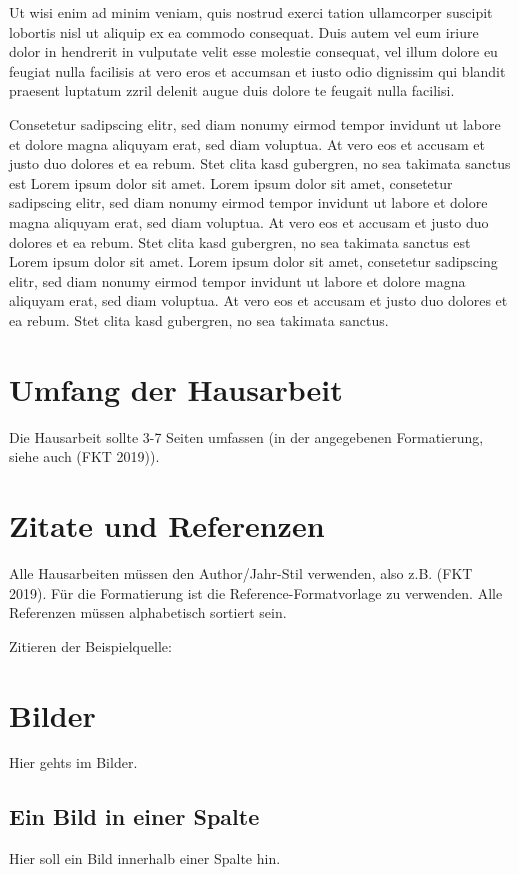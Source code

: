 Ut wisi enim ad minim veniam, quis nostrud exerci tation ullamcorper suscipit lobortis nisl ut aliquip ex ea commodo consequat. Duis autem vel eum iriure dolor in hendrerit in vulputate velit esse molestie consequat, vel illum dolore eu feugiat nulla facilisis at vero eros et accumsan et iusto odio dignissim qui blandit praesent luptatum zzril delenit augue duis dolore te feugait nulla facilisi.   


Consetetur sadipscing elitr, sed diam nonumy eirmod tempor invidunt ut labore et dolore magna aliquyam erat, sed diam voluptua. At vero eos et accusam et justo duo dolores et ea rebum. Stet clita kasd gubergren, no sea takimata sanctus est Lorem ipsum dolor sit amet. Lorem ipsum dolor sit amet, consetetur sadipscing elitr, sed diam nonumy eirmod tempor invidunt ut labore et dolore magna aliquyam erat, sed diam voluptua. At vero eos et accusam et justo duo dolores et ea rebum. Stet clita kasd gubergren, no sea takimata sanctus est Lorem ipsum dolor sit amet. Lorem ipsum dolor sit amet, consetetur sadipscing elitr, sed diam nonumy eirmod tempor invidunt ut labore et dolore magna aliquyam erat, sed diam voluptua. At vero eos et accusam et justo duo dolores et ea rebum. Stet clita kasd gubergren, no sea takimata sanctus.  

\section{Umfang der Hausarbeit}
Die Hausarbeit sollte 3-7 Seiten umfassen (in der angegebenen Formatierung, siehe auch (FKT 2019)).
\section{Zitate und Referenzen}
Alle Hausarbeiten müssen den Author/Jahr-Stil verwenden, also z.B. (FKT 2019).
Für die Formatierung ist die Reference-Formatvorlage zu verwenden. Alle Referenzen müssen alphabetisch sortiert sein.

Zitieren der Beispielquelle: \cite{beispiel}

\section{Bilder}
Hier gehts im Bilder.
\subsection{Ein Bild in einer Spalte}
Hier soll ein Bild innerhalb einer Spalte hin.

